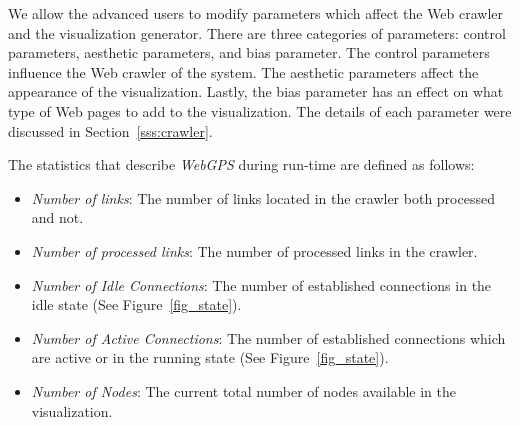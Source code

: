 \documentclass[10pt,psfig]{article}
\begin{document}
{{%



We allow the advanced users to modify parameters which affect the Web crawler and the visualization generator.
There are three categories of parameters: control parameters, aesthetic parameters, and bias parameter.
The control parameters influence the Web crawler of the system.
The aesthetic parameters affect the appearance of the visualization.
Lastly, the bias parameter has an effect on what type of Web pages to add to the visualization.
The details of each parameter were discussed in Section~\ref{sss:crawler}.

The statistics that describe {\em WebGPS} during run-time are defined as follows:

\begin{itemize}

\item {\em Number of links}: The number of links located in the crawler both processed and not.

\item {\em Number of processed links}: The number of processed links in the crawler.

\item {\em Number of Idle Connections}: The number of established connections in the idle state (See Figure~\ref{fig_state}).

\item {\em Number of Active Connections}: The number of established connections which are active or in the running state (See Figure~\ref{fig_state}).

\item {\em Number of Nodes}: The current total number of nodes available in the visualization.


\end{itemize}}}
\end{document}
